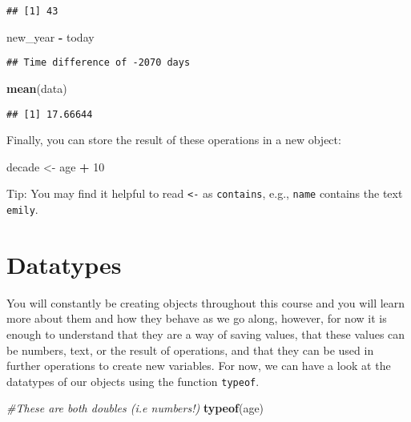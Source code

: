 \documentclass[
]{book}
\newenvironment{Shaded}{\begin{snugshade}}{\end{snugshade}}
\newcommand{\CommentTok}[1]{\textcolor[rgb]{0.56,0.35,0.01}{\textit{#1}}}
\newcommand{\DecValTok}[1]{\textcolor[rgb]{0.00,0.00,0.81}{#1}}
\newcommand{\FunctionTok}[1]{\textcolor[rgb]{0.13,0.29,0.53}{\textbf{#1}}}
\newcommand{\NormalTok}[1]{#1}
\newcommand{\OtherTok}[1]{\textcolor[rgb]{0.56,0.35,0.01}{#1}}
\newcommand{\SpecialCharTok}[1]{\textcolor[rgb]{0.81,0.36,0.00}{\textbf{#1}}}
\begin{document}
\begin{verbatim}
## [1] 43
\end{verbatim}

\begin{Shaded}
\begin{Highlighting}[]
\NormalTok{new\_year }\SpecialCharTok{{-}}\NormalTok{ today}
\end{Highlighting}
\end{Shaded}

\begin{verbatim}
## Time difference of -2070 days
\end{verbatim}

\begin{Shaded}
\begin{Highlighting}[]
\FunctionTok{mean}\NormalTok{(data)}
\end{Highlighting}
\end{Shaded}

\begin{verbatim}
## [1] 17.66644
\end{verbatim}

Finally, you can store the result of these operations in a new object:

\begin{Shaded}
\begin{Highlighting}[]
\NormalTok{decade }\OtherTok{\textless{}{-}}\NormalTok{ age }\SpecialCharTok{+} \DecValTok{10}
\end{Highlighting}
\end{Shaded}

Tip: You may find it helpful to read \texttt{\textless{}-} as \texttt{contains}, e.g., \texttt{name} contains the text \texttt{emily}.

\section{Datatypes}\label{datatypes}

You will constantly be creating objects throughout this course and you will learn more about them and how they behave as we go along, however, for now it is enough to understand that they are a way of saving values, that these values can be numbers, text, or the result of operations, and that they can be used in further operations to create new variables. For now, we can have a look at the datatypes of our objects using the function \texttt{typeof}.

\begin{Shaded}
\begin{Highlighting}[]
\CommentTok{\#These are both doubles (i.e numbers!)}
\FunctionTok{typeof}\NormalTok{(age)}
\end{Highlighting}
\end{Shaded}
\end{document}
